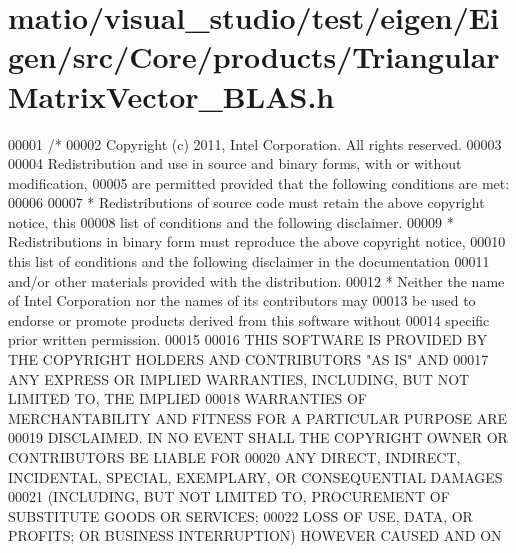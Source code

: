 \hypertarget{matio_2visual__studio_2test_2eigen_2_eigen_2src_2_core_2products_2_triangular_matrix_vector___b_l_a_s_8h_source}{}\section{matio/visual\+\_\+studio/test/eigen/\+Eigen/src/\+Core/products/\+Triangular\+Matrix\+Vector\+\_\+\+B\+L\+AS.h}
\label{matio_2visual__studio_2test_2eigen_2_eigen_2src_2_core_2products_2_triangular_matrix_vector___b_l_a_s_8h_source}

\begin{DoxyCode}
00001 \textcolor{comment}{/*}
00002 \textcolor{comment}{ Copyright (c) 2011, Intel Corporation. All rights reserved.}
00003 \textcolor{comment}{}
00004 \textcolor{comment}{ Redistribution and use in source and binary forms, with or without modification,}
00005 \textcolor{comment}{ are permitted provided that the following conditions are met:}
00006 \textcolor{comment}{}
00007 \textcolor{comment}{ * Redistributions of source code must retain the above copyright notice, this}
00008 \textcolor{comment}{   list of conditions and the following disclaimer.}
00009 \textcolor{comment}{ * Redistributions in binary form must reproduce the above copyright notice,}
00010 \textcolor{comment}{   this list of conditions and the following disclaimer in the documentation}
00011 \textcolor{comment}{   and/or other materials provided with the distribution.}
00012 \textcolor{comment}{ * Neither the name of Intel Corporation nor the names of its contributors may}
00013 \textcolor{comment}{   be used to endorse or promote products derived from this software without}
00014 \textcolor{comment}{   specific prior written permission.}
00015 \textcolor{comment}{}
00016 \textcolor{comment}{ THIS SOFTWARE IS PROVIDED BY THE COPYRIGHT HOLDERS AND CONTRIBUTORS "AS IS" AND}
00017 \textcolor{comment}{ ANY EXPRESS OR IMPLIED WARRANTIES, INCLUDING, BUT NOT LIMITED TO, THE IMPLIED}
00018 \textcolor{comment}{ WARRANTIES OF MERCHANTABILITY AND FITNESS FOR A PARTICULAR PURPOSE ARE}
00019 \textcolor{comment}{ DISCLAIMED. IN NO EVENT SHALL THE COPYRIGHT OWNER OR CONTRIBUTORS BE LIABLE FOR}
00020 \textcolor{comment}{ ANY DIRECT, INDIRECT, INCIDENTAL, SPECIAL, EXEMPLARY, OR CONSEQUENTIAL DAMAGES}
00021 \textcolor{comment}{ (INCLUDING, BUT NOT LIMITED TO, PROCUREMENT OF SUBSTITUTE GOODS OR SERVICES;}
00022 \textcolor{comment}{ LOSS OF USE, DATA, OR PROFITS; OR BUSINESS INTERRUPTION) HOWEVER CAUSED AND ON}

\end{DoxyCode}
